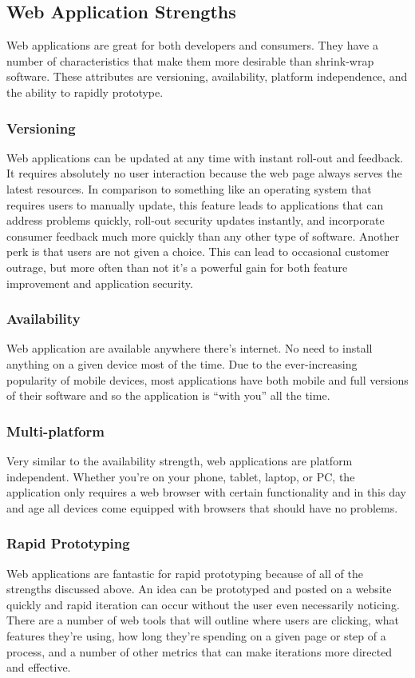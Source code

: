 \documentclass[11pt]{article}
\begin{document}
\subsection{Web Application Strengths}
Web applications are great for both developers and consumers. They have a number of characteristics that make them more desirable than shrink-wrap software. These attributes are versioning, availability, platform independence, and the ability to rapidly prototype.

\subsubsection{Versioning}
Web applications can be updated at any time with instant roll-out and feedback. It requires absolutely no user interaction because the web page always serves the latest resources. In comparison to something like an operating system that requires users to manually update, this feature leads to applications that can address problems quickly, roll-out security updates instantly, and incorporate consumer feedback much more quickly than any other type of software. Another perk is that users are not given a choice. This can lead to occasional customer outrage, but more often than not it's a powerful gain for both feature improvement and application security.

\subsubsection{Availability}
Web application are available anywhere there's internet. No need to install anything on a given device most of the time. Due to the ever-increasing popularity of mobile devices, most applications have both mobile and full versions of their software and so the application is ``with you'' all the time.

\subsubsection{Multi-platform}
Very similar to the availability strength, web applications are platform independent. Whether you're on your phone, tablet, laptop, or PC, the application only requires a web browser with certain functionality and in this day and age all devices come equipped with browsers that should have no problems.

\subsubsection{Rapid Prototyping}
Web applications are fantastic for rapid prototyping because of all of the strengths discussed above. An idea can be prototyped and posted on a website quickly and rapid iteration can occur without the user even necessarily noticing. There are a number of web tools that will outline where users are clicking, what features they're using, how long they're spending on a given page or step of a process, and a number of other metrics that can make iterations more directed and effective.
\end{document}
